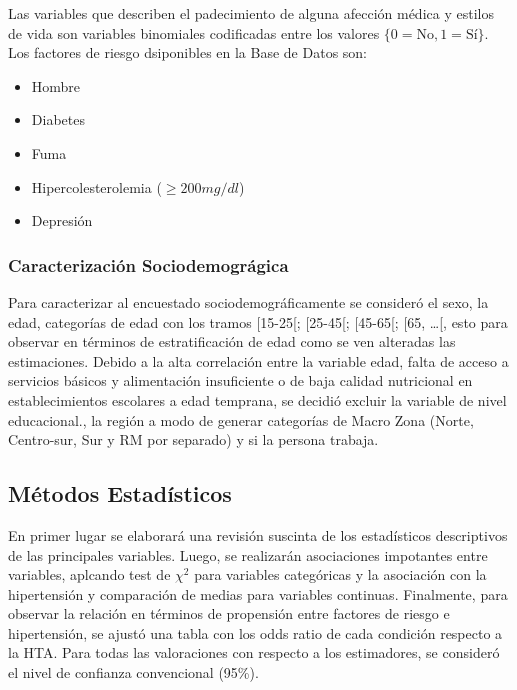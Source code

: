 \documentclass{aa}
\begin{document}
Las variables que describen el padecimiento de alguna afección médica y estilos de vida son variables binomiales codificadas entre los valores $\{0 = \textrm{No}, 1 = \textrm{Sí} \}$. Los factores de riesgo dsiponibles en la Base de Datos son:

\begin{itemize}
    \item Hombre
    \item      Diabetes
    \item      Fuma
         \item Hipercolesterolemia ($\geq 200 \textit{mg/dl} $)
         \item Depresión
\end{itemize}
 
\subsubsection{Caracterización Sociodemográgica}

Para caracterizar al encuestado sociodemográficamente se consideró el sexo, la edad, categorías de edad con los tramos [15-25[; [25-45[; [45-65[; [65, \dots [, esto para observar en términos de estratificación de edad como se ven alteradas las estimaciones. Debido a la alta correlación entre la variable edad, falta de acceso a servicios básicos y alimentación insuficiente o de baja calidad nutricional en establecimientos escolares a edad temprana, se decidió excluir la variable de nivel educacional., la región a modo de generar categorías de Macro Zona (Norte, Centro-sur, Sur y RM por separado) y si la persona trabaja.

\subsection{Métodos Estadísticos}

En primer lugar se elaborará una revisión suscinta de los estadísticos descriptivos de las principales variables. Luego, se realizarán asociaciones impotantes entre variables, aplcando test de $\chi^2$ para variables categóricas y la asociación con la hipertensión y comparación de medias para variables continuas. Finalmente, para observar la relación en términos de propensión entre factores de riesgo e hipertensión, se ajustó una tabla con los odds ratio de cada condición respecto a la HTA. Para todas las valoraciones con respecto a los estimadores, se consideró el nivel de confianza convencional (95\%).
\end{document}
